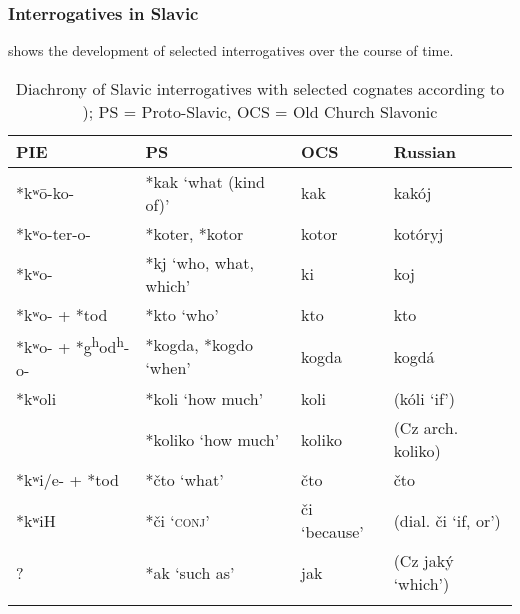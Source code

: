 \subsubsection{Interrogatives in Slavic}\label{sec:5.5.3.3}

 shows the development of selected  interrogatives over the course of time.

\begin{table}
\caption{Diachrony of Slavic interrogatives with selected cognates according to \cite{Derksen2008}); PS = {Proto-Slavic}, OCS = {Old Church Slavonic}}
\label{tab:indo:10}

\begin{tabularx}{\textwidth}{lQll}
\lsptoprule

\textbf{PIE} & \textbf{PS} & \textbf{OCS} & \textbf{Russian}\\
\midrule
*kʷ\=o-ko- & *kak ‘what (kind of)’ & kak & kakój\\
*kʷo-ter-o- & *koter, *kotor & kotor & kotóryj\\
*kʷo- & *kj ‘who, what, which’ & ki & koj\\
*kʷo- + *tod & *kto ‘who’ & kto & kto\\
*kʷo- + *g\textsuperscript{h}od\textsuperscript{h}-o- & *kogda, *kogdo ‘when’ & kogda & kogdá\\
*kʷoli & *koli ‘how much’ & koli & (kóli ‘if’)\\
       & *koliko ‘how much’ & koliko & (Cz arch. koliko)\\
*kʷi/e- + *tod & *čto ‘what’ & čto & čto\\
*kʷiH & *či ‘\textsc{conj}’ & či ‘because’ & (dial. či ‘if, or’)\\
? & *ak ‘such as’ & jak & (Cz jaký ‘which’)\\
\lspbottomrule
\end{tabularx}
\end{table}


